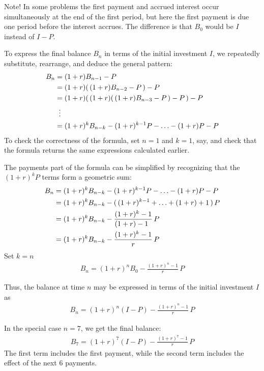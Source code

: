 \documentclass[12pt]{article}
\begin{document}
\begin{enumerate}
\begin{answer}
Note! In some problems the first payment and accrued interest occur simultaneously at the end of the first period, but here the first payment is due one period before the interest accrues. The difference is that $B_{0}$ would be $I$ instead of $I-P$. 

To express the final balance $B_{n}$ in terms of the initial investment $I$, we repeatedly substitute, rearrange, and deduce the general pattern:
\begin{align*}
B_{n} & = (1+r)B_{n-1} - P\\
      & = (1+r)(\, (1+r)B_{n-2} - P \,) - P\\
      & = (1+r)(\,(1+r)(\,(1+r)B_{n-3} - P \,) - P \,) - P\\
      &\vdotswithin{=}\\
      & = (1+r)^{k}B_{n-k} - (1+r)^{k-1}P - \ldots  - (1+r)P - P
\end{align*}
To check the correctness of the formula, set $n=1$ and $k=1$, say, and check that the formula returns the same expressions calculated earlier. 

The payments part of the formula can be simplified by recognizing that the $(1+r)^{k}P$ terms form a geometric sum:
\begin{align*}
B_{n} & = (1+r)^{k}B_{n-k} - (1+r)^{k-1}P - \ldots  - (1+r)P - P \\
      & = (1+r)^{k}B_{n-k} - (\, (1+r)^{k-1} + \ldots  + (1+r) +1 \,)  \, P \\
      & = (1+r)^{k}B_{n-k} - \frac{(1+r)^{k}-1}{(1+r)-1\hfill}  \, P \\
      & = (1+r)^{k}B_{n-k} - \frac{(1+r)^{k}-1}{r}  \, P
\end{align*}
Set $k=n$
\begin{align*}
B_{n} = (1+r)^{n}B_{0} - \frac{(1+r)^{n}-1}{r} \, P
\end{align*}

Thus, the balance at time $n$ may be expressed in terms of the initial investment $I$ as
\begin{align*}
B_{n} = (1+r)^{n}(I - P) - \frac{(1+r)^{n}-1}{r} \, P
\end{align*}

In the special case $n=7$, we get the final balance:
\begin{align*}
B_{7} = (1+r)^{7}(I-P) - \frac{(1+r)^{7}-1}{r} \, P
\end{align*}
The first term includes the first payment, while the second term includes the effect of the next $6$ payments. 


\end{answer}
\end{enumerate}
\end{document}
